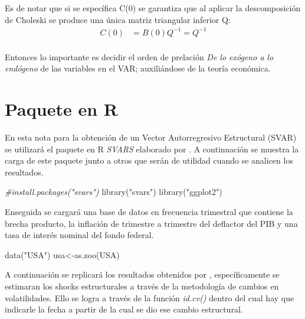 \documentclass[
]{book}
\newenvironment{Shaded}{\begin{snugshade}}{\end{snugshade}}
\newcommand{\CommentTok}[1]{\textcolor[rgb]{0.56,0.35,0.01}{\textit{#1}}}
\newcommand{\FunctionTok}[1]{\textcolor[rgb]{0.00,0.00,0.00}{#1}}
\newcommand{\NormalTok}[1]{#1}
\newcommand{\OtherTok}[1]{\textcolor[rgb]{0.56,0.35,0.01}{#1}}
\newcommand{\StringTok}[1]{\textcolor[rgb]{0.31,0.60,0.02}{#1}}
\begin{document}
Es de notar que si se específica C(0) se garantiza que al aplicar la descomposición de Choleski se produce una única matriz triangular inferior Q:
\begin{align}
C(0)&=B(0)Q^{-1}=Q^{-1} \nonumber\\
\end{align}

Entonces lo importante es decidir el orden de prelación \emph{De lo exógeno a lo endógeno} de las variables en el VAR; auxiliándose de la teoría económica.

\hypertarget{paquete-en-r}{%
\section{Paquete en R}\label{paquete-en-r}}

En esta nota para la obtención de un Vector Autorregresivo Estructural (SVAR) se utilizará el paquete en R \emph{SVARS} elaborado por \citet{SVAR21}. A continuación se muestra la carga de este paquete junto a otros que serán de utilidad cuando se analicen los resultados.

\begin{Shaded}
\begin{Highlighting}[]
\CommentTok{\#install.packages("svars")}
\FunctionTok{library}\NormalTok{(}\StringTok{"svars"}\NormalTok{)}
\FunctionTok{library}\NormalTok{(}\StringTok{"ggplot2"}\NormalTok{)}
\end{Highlighting}
\end{Shaded}

Enseguida se cargará una base de datos en frecuencia trimestral que contiene la brecha producto, la inflación de trimestre a trimestre del deflactor del PIB y una tasa de interés nominal del fondo federal.

\begin{Shaded}
\begin{Highlighting}[]
\FunctionTok{data}\NormalTok{(}\StringTok{"USA"}\NormalTok{)}
\NormalTok{usa}\OtherTok{\textless{}{-}}\FunctionTok{as.zoo}\NormalTok{(USA)}
\end{Highlighting}
\end{Shaded}

A continuación se replicará los resultados obtenidos por \citet{Herwartz2016}, específicamente se estimaran los shocks estructurales a través de la metodología de cambios en volatilidades. Ello se logra a través de la función \emph{id.cv()} dentro del cual hay que indicarle la fecha a partir de la cual se dio ese cambio estructural.
\end{document}
